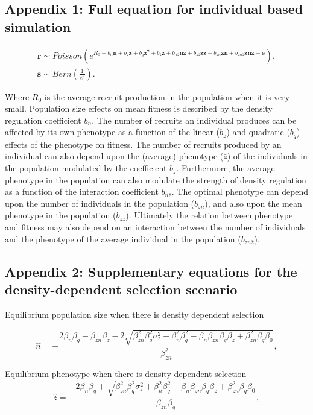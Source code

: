 \documentclass{article}
\begin{document}
 \subsection{Appendix 1: Full equation for individual based simulation}
 
 \begin{subequations}
 	\begin{gather}
 	\bm{r}\sim Poisson(e^{R_{0} + b_{n} \bm{n} + b_{z} \bm{z} + b_{q} \bm{z^2} + b_{\bar{z}} \bm{\bar{z}} + b_{n \bar{z}} \bm{n\bar{z}} + b_{z\bar{z}}  \bm{z\bar{z}} + b_{zn}  \bm{zn} + b_{zn \bar{z}} \bm{zn\bar{z}}+  \bm{e}}), \tag{B3.1a}\label{full sim a} \\
 	\bm{s}\sim Bern(\frac{1}{e^{\bar{p}}}). \tag{B3.1b}\label{full sim b}
 	\end{gather}
 \end{subequations}
 
 Where $R_0$ is the average recruit production in the population when it is very small. Population size effects on mean fitness is described by the density regulation coefficient $b_{n}$. The number of recruits an individual produces can be affected by its own phenotype as a function of the linear ($b_z$) and quadratic ($b_q$) effects of the phenotype on fitness. The number of recruits produced by an individual can also depend upon the (average) phenotype ($\bar{z}$) of the individuals in the population modulated by the coefficient $b_{\bar{z}}$. Furthermore, the average phenotype in the population can also modulate the strength of density regulation as a function of the interaction coefficient $b_{n\bar{z}}$. The optimal phenotype can depend upon the number of individuals in the population ($b_{zn}$), and also upon the mean phenotype in the population ($b_{z\bar{z}}$). Ultimately the relation between phenotype and fitness may also depend on an interaction between the number of individuals and the phenotype of the average individual in the population ($b_{zn\bar{z}}$).
 
 
 \subsection{Appendix 2: Supplementary equations for the density-dependent selection scenario}
 
 Equilibrium population size when there is density dependent selection

 \begin{equation}
 \hat{n} = -\frac{2\beta_{n}\beta_{q} - \beta_{zn}\beta_{z} - 2 \sqrt{\beta_{zn}^2\beta_{q}^2 \sigma^2_z + \beta_{n}^2\beta_{q}^2-\beta_{n}\beta_{zn}\beta_{q}\beta_{z} + \beta_{zn}^2\beta_{q}\beta_{0}}}{\beta_{zn}^2} ,
 \end{equation}

 \noindent Equilibrium phenotype when there is density dependent selection
  \begin{equation}
 \hat{z} = -\frac{2\beta_{n}\beta_{q} + \sqrt{\beta_{zn}^2\beta_{q}^2 \sigma^2_z + \beta_{n}^2\beta_{q}^2-\beta_{n}\beta_{zn}\beta_{q}\beta_{z} + \beta_{zn}^2\beta_{q}\beta_{0}}}{\beta_{zn}\beta_{q}} ,
 \end{equation}
 
 
\end{document}
